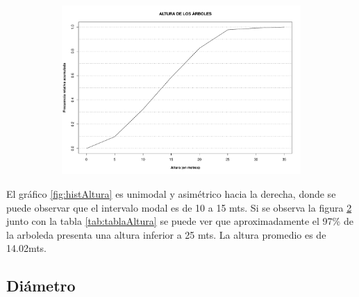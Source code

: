 \documentclass[11pt]{article}
\begin{document}
\begin{figure}[h!]
  \ContinuedFloat
  \begin{center}
    \begin{subfigure}[b]{0.9\linewidth}
      \includegraphics[width=\linewidth]{acumAltura.pdf}
      \caption{}
      \label{fig:acumAltura}
    \end{subfigure}
    \caption{}
  \end{center}
\end{figure}

\begin{justify}
  El gráfico \ref{fig:histAltura} es unimodal y asimétrico hacia la derecha,
  donde se puede observar que el intervalo modal es de 10 a 15 mts.
  Si se observa la figura \ref{fig:acumAltura}
  junto con la tabla \ref{tab:tablaAltura} se puede ver que aproximadamente
  el 97\% de la arboleda presenta una altura inferior a 25 mts.
  La altura promedio es de 14.02mts.
\end{justify}


\subsection{Diámetro}
\end{document}
